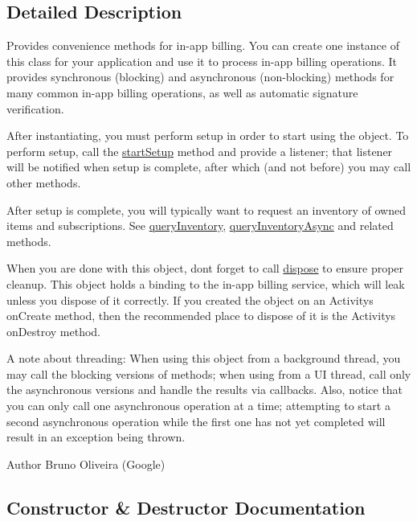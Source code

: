 \subsection{Detailed Description}
Provides convenience methods for in-\/app billing. You can create one instance of this class for your application and use it to process in-\/app billing operations. It provides synchronous (blocking) and asynchronous (non-\/blocking) methods for many common in-\/app billing operations, as well as automatic signature verification.

After instantiating, you must perform setup in order to start using the object. To perform setup, call the \hyperlink{classorg_1_1cocos2dx_1_1plugin_1_1util_1_1IabHelper_a4eb405a91ab5d6d6bb94a69ac0c54ec3}{start\+Setup} method and provide a listener; that listener will be notified when setup is complete, after which (and not before) you may call other methods.

After setup is complete, you will typically want to request an inventory of owned items and subscriptions. See \hyperlink{}{query\+Inventory}, \hyperlink{classorg_1_1cocos2dx_1_1plugin_1_1util_1_1IabHelper_ab32d6d559bf5ae8289f996d1717b292e}{query\+Inventory\+Async} and related methods.

When you are done with this object, don\textquotesingle{}t forget to call \hyperlink{classorg_1_1cocos2dx_1_1plugin_1_1util_1_1IabHelper_add41920802456afa1594822fc5e4b93d}{dispose} to ensure proper cleanup. This object holds a binding to the in-\/app billing service, which will leak unless you dispose of it correctly. If you created the object on an Activity\textquotesingle{}s on\+Create method, then the recommended place to dispose of it is the Activity\textquotesingle{}s on\+Destroy method.

A note about threading\+: When using this object from a background thread, you may call the blocking versions of methods; when using from a UI thread, call only the asynchronous versions and handle the results via callbacks. Also, notice that you can only call one asynchronous operation at a time; attempting to start a second asynchronous operation while the first one has not yet completed will result in an exception being thrown.

\begin{DoxyAuthor}{Author}
Bruno Oliveira (Google) 
\end{DoxyAuthor}


\subsection{Constructor \& Destructor Documentation}
\mbox{\label{classorg_1_1cocos2dx_1_1plugin_1_1util_1_1IabHelper_a4161283ba1134bbc0d80466c05010872}} 
